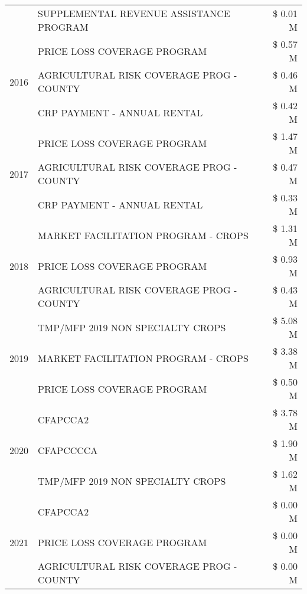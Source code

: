 \begin{tabular}{llr}
 & SUPPLEMENTAL REVENUE ASSISTANCE PROGRAM & \$ 0.01 M \\
\cline{1-3}
\multirow[t]{3}{*}{2016} & PRICE LOSS COVERAGE PROGRAM & \$ 0.57 M \\
 & AGRICULTURAL RISK COVERAGE PROG - COUNTY & \$ 0.46 M \\
 & CRP PAYMENT - ANNUAL RENTAL & \$ 0.42 M \\
\cline{1-3}
\multirow[t]{3}{*}{2017} & PRICE LOSS COVERAGE PROGRAM & \$ 1.47 M \\
 & AGRICULTURAL RISK COVERAGE PROG - COUNTY & \$ 0.47 M \\
 & CRP PAYMENT - ANNUAL RENTAL & \$ 0.33 M \\
\cline{1-3}
\multirow[t]{3}{*}{2018} & MARKET FACILITATION PROGRAM - CROPS & \$ 1.31 M \\
 & PRICE LOSS COVERAGE PROGRAM & \$ 0.93 M \\
 & AGRICULTURAL RISK COVERAGE PROG - COUNTY & \$ 0.43 M \\
\cline{1-3}
\multirow[t]{3}{*}{2019} & TMP/MFP 2019 NON SPECIALTY CROPS & \$ 5.08 M \\
 & MARKET FACILITATION PROGRAM - CROPS & \$ 3.38 M \\
 & PRICE LOSS COVERAGE PROGRAM & \$ 0.50 M \\
\cline{1-3}
\multirow[t]{3}{*}{2020} & CFAPCCA2 & \$ 3.78 M \\
 & CFAPCCCCA & \$ 1.90 M \\
 & TMP/MFP 2019 NON SPECIALTY CROPS & \$ 1.62 M \\
\cline{1-3}
\multirow[t]{3}{*}{2021} & CFAPCCA2 & \$ 0.00 M \\
 & PRICE LOSS COVERAGE PROGRAM & \$ 0.00 M \\
 & AGRICULTURAL RISK COVERAGE PROG - COUNTY & \$ 0.00 M \\
\cline{1-3}
\bottomrule
\end{tabular}
